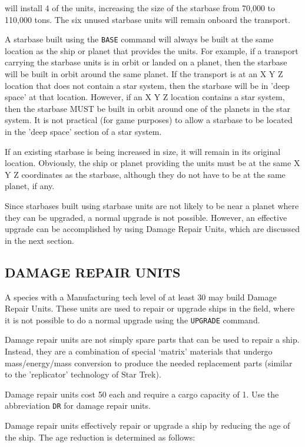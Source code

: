 \documentclass[10pt,titlepage]{article}
\begin{document}
will install 4 of the units, increasing the size of the starbase from 70,000 to
110,000 tons.  The six unused starbase units will remain onboard the transport.

A starbase built using the \texttt{BASE} command will always be built at the same
location as the ship or planet that provides the units.  For example, if a
transport carrying the starbase units is in orbit or landed on a planet, then
the starbase will be built in orbit around the same planet.  If the transport
is at an X Y Z location that does not contain a star system, then the starbase
will be in 'deep space' at that location.  However, if an X Y Z location
contains a star system, then the starbase MUST be built in orbit around one of
the planets in the star system.  It is not practical (for game purposes) to
allow a starbase to be located in the 'deep space' section of a star system.

If an existing starbase is being increased in size, it will remain in its
original location.  Obviously, the ship or planet providing the units must be
at the same X Y Z coordinates as the starbase, although they do not have to be
at the same planet, if any.

Since starbases built using starbase units are not likely to be near a planet
where they can be upgraded, a normal upgrade is not possible.  However, an
effective upgrade can be accomplished by using Damage Repair Units, which are
discussed in the next section.

\newpage
\subsection{DAMAGE REPAIR UNITS}

A species with a Manufacturing tech level of at least 30 may build Damage
Repair Units.  These units are used to repair or upgrade ships in the field,
where it is not possible to do a normal upgrade using the \texttt{UPGRADE} command.

Damage repair units are not simply spare parts that can be used to repair a
ship.  Instead, they are a combination of special `matrix' materials that
undergo mass/energy/mass conversion to produce the needed replacement parts
(similar to the 'replicator' technology of Star Trek).

Damage repair units cost 50 each and require a cargo capacity of 1.  Use the
abbreviation \texttt{DR} for damage repair units.

Damage repair units effectively repair or upgrade a ship by reducing the age
of the ship.  The age reduction is determined as follows:
\end{document}

